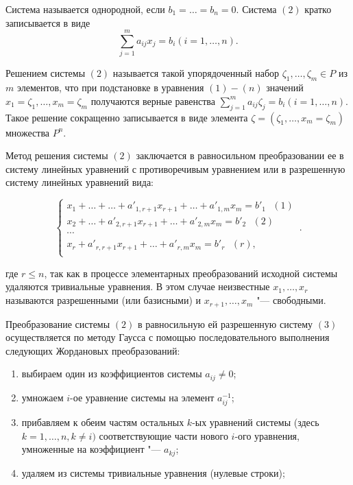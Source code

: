 \documentclass[bachelor, och, labwork]{shiza}
\begin{document}
        Система называется однородной, если $b_1 = \dots = b_n = 0$. Система
        $(2)$ кратко записывается в виде $$\sum_{j = 1}^{m} a_{ij} x_j = b_i (i
        = 1, \dots, n).$$

        Решением системы $(2)$ называется такой упорядоченный набор $\zeta_1,
        \dots, \zeta_m \in P$ из $m$ элементов, что при подстановке в уравнения
        $(1)-(n)$ значений $x_1 = \zeta_1, \dots, x_m = \zeta_m$ получаются
        верные равенства $\sum_{j = 1}^{m} a_{ij} \zeta_j = b_i (i = 1, \dots,
        n)$. Такое решение сокращенно записывается в виде элемента $\zeta =
        (\zeta_1, \dots, x_m = \zeta_m)$ множества $P^{n}$.

        Метод решения системы $(2)$ заключается в равносильном преобразовании
        ее в систему линейных уравнений с противоречивым уравнением или в
        разрешенную систему линейных уравнений вида:

        \begin{equation}
            \begin{cases}
                x_1 + \dots + \dots + a'_{1,r+1}x_{r+1} + \dots + a'_{1,m}x_{m} = b'_1 \text{ } (1)\\            
                x_2 + \dots + a'_{2,r+1}x_{r+1} + \dots + a'_{2,m}x_{m} = b'_2 \text{ }(2)\\            
                \cdots\\
                x_r + a'_{r,r+1}x_{r+1} + \dots + a'_{r,m}x_{m} = b'_r \text{ } (r),\\            
            \end{cases}\,.
        \end{equation}

        где $r \leq n$, так как в процессе элементарных преобразований исходной
        системы удаляются тривиальные уравнения. В этом случае неизвестные $x_1,
        \dots, x_r$ называются разрешенными (или базисными) и $x_{r + 1}, \dots,
        x_m$ "--- свободными.

        Преобразование системы $(2)$ в равносильную ей разрешенную систему $(3)$
        осуществляется по методу Гаусса с помощью последовательного выполнения
        следующих Жордановых преобразований:

        \begin{enumerate}
            \item выбираем один из коэффициентов системы $a_{ij} \neq 0$;
            \item умножаем $i$-ое уравнение системы на элемент $a^{-1}_{ij}$;
            \item прибавляем к обеим частям остальных $k$-ых уравнений системы
            (здесь $k = 1, \dots, n, k \neq i)$ соответствующие части нового
            $i$-ого уравнения, умноженные на коэффициент "--- $a_{kj}$;
            \item удаляем из системы тривиальные уравнения (нулевые строки);
        \end{enumerate}
\end{document}
